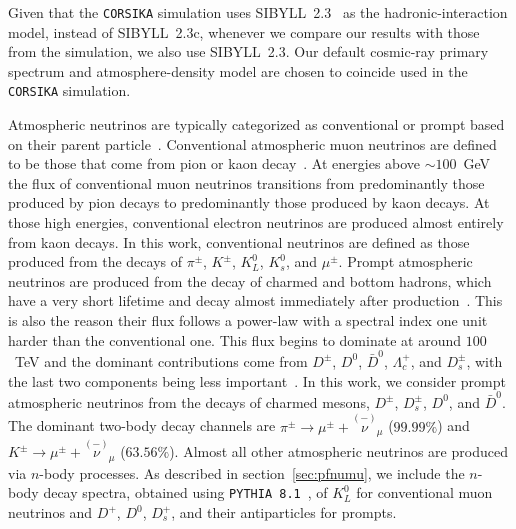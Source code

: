 \documentclass[aps,prd,showpacs,letterpaper,onecolumn,longbibliography,superscriptaddress,notitlepage,nofootinbib]{revtex4-1}%
\newcommand{\CORSIKA}{\texttt{CORSIKA}}
\newcommand{\barparen}[2]{\overset{\scriptscriptstyle (-)}{#1}_{\!\!#2}}
\begin{document}
Given that the \CORSIKA{} simulation uses SIBYLL~2.3~\cite{Engel:2015dxa, Riehn:2015oba} as the hadronic-interaction model, instead of SIBYLL~2.3c, whenever we compare our results with those from the simulation, we also use SIBYLL~2.3. Our default cosmic-ray primary spectrum and atmosphere-density model are chosen to coincide used in the \CORSIKA{} simulation.

Atmospheric neutrinos are typically categorized as conventional or prompt based on their parent particle~\cite{Gaisser:2002jj}. Conventional atmospheric muon neutrinos are defined to be those that come from pion or kaon decay~\cite{Barr:2004br, Honda:2006qj, Honda:2011nf, Petrova:2012qf, Sinegovskaya:2014pia, Gaisser:2014pda, Honda:2015fha}. At energies above $\sim 100$~GeV the flux of conventional muon neutrinos transitions from predominantly those produced by pion decays to predominantly those produced by kaon decays. At those high energies, conventional electron neutrinos are produced almost entirely from kaon decays. In this work, conventional neutrinos are defined as those produced from the decays of $\pi^{\pm}$, $K^{\pm}$, $K^0_L$, $K^0_s$, and $\mu^{\pm}$. Prompt atmospheric neutrinos are produced from the decay of charmed and bottom hadrons, which have a very short lifetime and decay almost immediately after production~\cite{Gondolo:1995fq, Pasquali:1998ji, Pasquali:1998xf, Martin:2003us, Enberg:2008te, Bhattacharya:2015jpa, Garzelli:2015psa, Gauld:2015yia, Gauld:2015kvh, Bhattacharya:2016jce, Garzelli:2016xmx, Benzke:2017yjn, Sinegovsky:2017gkg}. This is also the reason their flux follows a power-law with a spectral index one unit harder than the conventional one. This flux begins to dominate at around $100$~TeV and the dominant contributions come from $D^{\pm}$, $D^0$, $\bar{D}^0$, $\Lambda_c^+$, and $D_s^{\pm}$, with the last two components being less important~\cite{Fedynitch:2015zma}. In this work, we consider prompt atmospheric neutrinos from the decays of charmed mesons, $D^{\pm}$, $D^{\pm}_s$, $D^0$, and $\bar{D}^0$. The dominant two-body decay channels are $\pi^{\pm} \rightarrow \mu^{\pm} +  \barparen{\nu}{\mu}$ ($99.99\%$) and $K^{\pm} \rightarrow \mu^{\pm} + \barparen{\nu}{\mu}$ ($63.56\%$). Almost all other atmospheric neutrinos are produced via $n$-body processes. As described in section~\ref{sec:pfnumu}, we include the $n$-body decay spectra, obtained using \texttt{PYTHIA~8.1}~\cite{Sjostrand:2008py}, of $K^0_L$ for conventional muon neutrinos and $D^+$, $D^0$, $D_s^+$, and their antiparticles for prompts.
\end{document}
